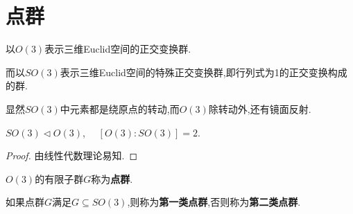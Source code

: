 \documentclass[../../main.tex]{subfiles}%
\begin{document}
\section{点群}

\begin{definition}
以$O(3)$表示三维Euclid空间的正交变换群.

而以$SO(3)$表示三维Euclid空间的特殊正交变换群,即行列式为1的正交变换构成的群.
\end{definition}
\begin{remark}
显然$SO(3)$中元素都是绕原点的转动,而$O(3)$除转动外,还有镜面反射.
\end{remark}

\begin{proposition}\label{proposition:SO(3)是O(3)的正规子群且商群阶为2}
$SO(3) \lhd O(3)$, $\quad [O(3):SO(3)]=2.$
\end{proposition}
\begin{proof}

由线性代数理论易知.

\end{proof}

\begin{definition}
$O(3)$的有限子群$G$称为\textbf{点群}.

如果点群$G$满足$G \subseteq SO(3)$,则称为\textbf{第一类点群},否则称为\textbf{第二类点群}.
\end{definition}
\end{document}
